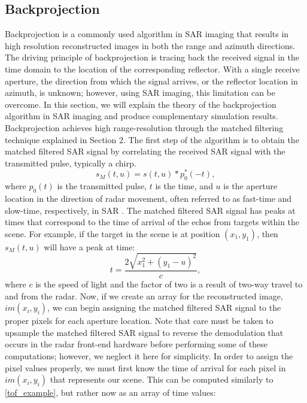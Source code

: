 \documentclass{article}
\begin{document}
\subsection{Backprojection}
\indent\indent
Backprojection is a commonly used algorithm in SAR imaging that results in high resolution reconstructed images in both the range and azimuth directions. The driving principle of backprojection is tracing back the received signal in the time domain to the location of the corresponding reflector. With a single receive aperture, the direction from which the signal arrives, or the reflector location in azimuth, is unknown; however, using SAR imaging, this limitation can be overcome. In this section, we will explain the theory of the backprojection algorithm in SAR imaging and produce complementary simulation results.
\newline
\indent
Backprojection achieves high range-resolution through the matched filtering technique explained in Section 2. The first step of the algorithm is to obtain the matched filtered SAR signal by correlating the received SAR signal with the transmitted pulse, typically a chirp.
\begin{equation}
\label{mf_sig}
s_M(t,u) = s(t,u) \ast p_0^{\ast}(-t),
\end{equation}
where $p_0(t)$ is the transmitted pulse, $t$ is the time, and $u$ is the aperture location in the direction of radar movement, often referred to as fast-time and slow-time, respectively, in SAR \cite{SARbook}. The matched filtered SAR signal has peaks at times that correspond to the time of arrival of the echos from targets within the scene. For example, if the target in the scene is at position $(x_1,y_1)$, then $s_M(t,u)$ will have a peak at time:
\begin{equation}
\label{tof_example}
t = \frac{2\sqrt{x_1^2+(y_1-u)^2}}{c},
\end{equation}
where $c$ is the speed of light and the factor of two is a result of two-way travel to and from the radar. 
\newline
\indent
Now, if we create an array for the reconstructed image, $im(x_i,y_i)$, we can begin assigning the matched filtered SAR signal to the proper pixels for each aperture location. Note that care must be taken to upsample the matched filtered SAR signal to reverse the demodulation that occurs in the radar front-end hardware before performing some of these computations; however, we neglect it here for simplicity. In order to assign the pixel values properly, we must first know the time of arrival for each pixel in $im(x_i,y_i)$ that represents our scene. This can be computed similarly to \eqref{tof_example}, but rather now as an array of time values:
\end{document}
